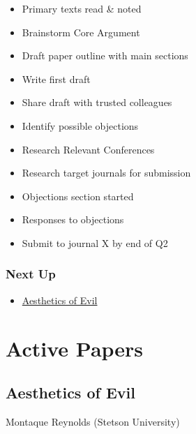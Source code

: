 \documentclass[
  letterpaper,
  DIV=11,
  numbers=noendperiod]{scrreprt}
\providecommand{\tightlist}{%
  \setlength{\itemsep}{0pt}\setlength{\parskip}{0pt}}\usepackage{longtable,booktabs,array}
\begin{document}
\begin{tcolorbox}[enhanced jigsaw, arc=.35mm, breakable, rightrule=.15mm, colback=white, colframe=quarto-callout-important-color-frame, bottomrule=.15mm, leftrule=.75mm, opacityback=0, toprule=.15mm, left=2mm]
\begin{tcolorbox}[enhanced jigsaw, arc=.35mm, breakable, rightrule=.15mm, colback=white, colframe=quarto-callout-tip-color-frame, bottomrule=.15mm, leftrule=.75mm, opacityback=0, toprule=.15mm, left=2mm]
\begin{tcolorbox}[enhanced jigsaw, bottomrule=.15mm, colback=white, breakable, arc=.35mm, rightrule=.15mm, toprule=.15mm, left=2mm, leftrule=.75mm, opacityback=0, colframe=quarto-callout-tip-color-frame]
\begin{itemize}
  \begin{itemize}
  \tightlist
  \item[$\square$]
    Imago Dei as Human Identity by Ryan Peterson
  \end{itemize}
\item[$\square$]
  Primary texts read \& noted
\item[$\square$]
  Brainstorm Core Argument
\item[$\square$]
  Draft paper outline with main sections
\item[$\square$]
  Write first draft
\item[$\square$]
  Share draft with trusted colleagues
\item[$\square$]
  Identify possible objections
\item[$\square$]
  Research Relevant Conferences
\item[$\square$]
  Research target journals for submission
\item[$\square$]
  Objections section started
\item[$\square$]
  Responses to objections
\item[$\square$]
  Submit to journal X by end of Q2
\end{itemize}

\end{tcolorbox}

\section{Next Up}\label{next-up}

\begin{itemize}
\tightlist
\item
  \href{./papers/paper-1-aes-evi/index.qmd}{Aesthetics of Evil}
\end{itemize}

\part{Active Papers}

\chapter{Aesthetics of Evil}\label{aesthetics-of-evil}

Montaque Reynolds (Stetson University)

\hfill\break


\end{tcolorbox}
\end{tcolorbox}
\end{document}
